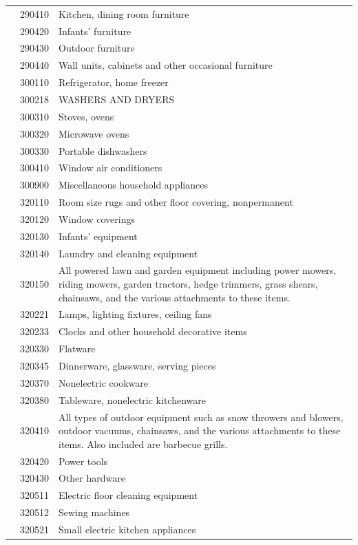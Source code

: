 \documentclass[
]{agujournal2019}
\newcounter{none} %
\begin{document}
\begin{table}
{\begin{tabular*}{\linewidth}{@{\extracolsep{\fill}}l|rl}
 & 290410 & Kitchen, dining room furniture \\ 
 & 290420 & Infants' furniture \\ 
 & 290430 & Outdoor furniture \\ 
 & 290440 & Wall units, cabinets and other occasional furniture \\ 
 & 300110 & Refrigerator, home freezer \\ 
 & 300218 & WASHERS AND DRYERS \\ 
 & 300310 & Stoves, ovens \\ 
 & 300320 & Microwave ovens \\ 
 & 300330 & Portable dishwashers \\ 
 & 300410 & Window air conditioners \\ 
 & 300900 & Miscellaneous household appliances \\ 
 & 320110 & Room size rugs and other floor covering, nonpermanent \\ 
 & 320120 & Window coverings \\ 
 & 320130 & Infants' equipment \\ 
 & 320140 & Laundry and cleaning equipment \\ 
 & 320150 & All powered lawn and garden equipment including power mowers, riding mowers, garden tractors, hedge trimmers, grass shears, chainsaws, and the various attachments to these items. \\ 
 & 320221 & Lamps, lighting fixtures, ceiling fans \\ 
 & 320233 & Clocks and other household decorative items \\ 
 & 320330 & Flatware \\ 
 & 320345 & Dinnerware, glassware, serving pieces \\ 
 & 320370 & Nonelectric cookware \\ 
 & 320380 & Tableware, nonelectric kitchenware \\ 
 & 320410 & All types of outdoor equipment such as snow throwers and blowers, outdoor vacuums, chainsaws, and the various attachments to these items. Also included are barbecue grills. \\ 
 & 320420 & Power tools \\ 
 & 320430 & Other hardware \\ 
 & 320511 & Electric floor cleaning equipment \\ 
 & 320512 & Sewing machines \\ 
 & 320521 & Small electric kitchen appliances \\ 

\end{tabular*}}
\end{table}
\end{document}
